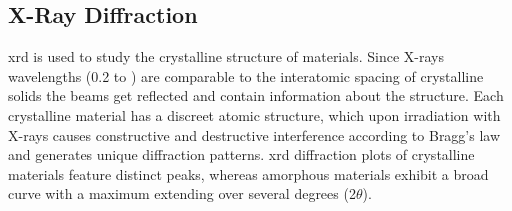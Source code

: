 

\subsection{X-Ray Diffraction}
\gls{xrd} is used to study the crystalline structure of materials.
Since X-rays wavelengths (\num{0.2} to ) are comparable to the interatomic spacing of crystalline solids the beams get reflected and contain information about the structure\cite{Kaliva2020}.
Each crystalline material has a discreet atomic structure, which upon irradiation with 
X-rays causes constructive and destructive interference according to Bragg's law and generates unique diffraction patterns. 
\Gls{xrd} diffraction plots of crystalline materials feature distinct peaks, whereas amorphous materials exhibit a broad curve with a maximum extending over several degrees (2$\theta$).


